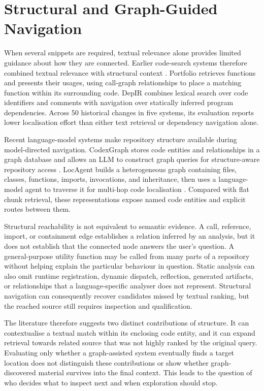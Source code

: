 \section{Structural and Graph-Guided Navigation}\label{sec:structural-and-graph-guided-navigation}

When several snippets are required, textual relevance alone provides limited guidance about how they are connected. Earlier code-search systems therefore combined textual relevance with structural context \textcite{McMillan2011Portfolio,Petrenko2013DepIR}. Portfolio \textcite{McMillan2011Portfolio} retrieves functions and presents their usages, using call-graph relationships to place a matching function within its surrounding code. DepIR \textcite{Petrenko2013DepIR} combines lexical search over code identifiers and comments with navigation over statically inferred program dependencies. Across 50 historical changes in five systems, its evaluation reports lower localisation effort than either text retrieval or dependency navigation alone.

Recent language-model systems make repository structure available during model-directed navigation. CodexGraph stores code entities and relationships in a graph database and allows an LLM to construct graph queries for structure-aware repository access \textcite{Liu2025CodexGraph}. LocAgent builds a heterogeneous graph containing files, classes, functions, imports, invocations, and inheritance, then uses a language-model agent to traverse it for multi-hop code localisation \textcite{Chen2025LocAgent}. Compared with flat chunk retrieval, these representations expose named code entities and explicit routes between them.

Structural reachability is not equivalent to semantic evidence. A call, reference, import, or containment edge establishes a relation inferred by an analysis, but it does not establish that the connected node answers the user's question. A general-purpose utility function may be called from many parts of a repository without helping explain the particular behaviour in question. Static analysis can also omit runtime registration, dynamic dispatch, reflection, generated artifacts, or relationships that a language-specific analyser does not represent. Structural navigation can consequently recover candidates missed by textual ranking, but the reached source still requires inspection and qualification.

The literature \textcite{McMillan2011Portfolio,Petrenko2013DepIR} therefore suggests two distinct contributions of structure. It can contextualise a textual match within its enclosing code entity, and it can expand retrieval towards related source that was not highly ranked by the original query. Evaluating only whether a graph-assisted system eventually finds a target location does not distinguish these contributions or show whether graph-discovered material survives into the final context. This leads to the question of who decides what to inspect next and when exploration should stop.


